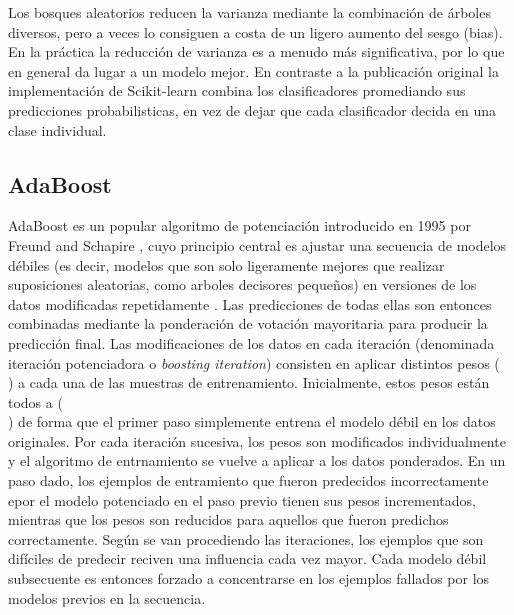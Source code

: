 Los bosques aleatorios reducen la varianza mediante la combinación de árboles diversos, pero a veces lo consiguen a costa de un ligero aumento del sesgo (bias).
En la práctica la reducción de varianza es a menudo más significativa, por lo que en general da lugar a un modelo mejor.
En contraste a la publicación original %
la implementación de Scikit-learn combina los clasificadores promediando sus predicciones probabilisticas, en vez de dejar que cada clasificador decida en una clase individual.

\subsection{AdaBoost}


AdaBoost es un popular algoritmo de potenciación introducido en 1995 por Freund and Schapire %
, cuyo principio central es ajustar una secuencia de modelos débiles (es decir, modelos que son solo ligeramente mejores que realizar suposiciones aleatorias, como arboles decisores pequeños) en versiones de los datos modificadas repetidamente . Las predicciones de todas ellas son entonces combinadas mediante la ponderación de votación mayoritaria para producir la predicción final.
Las modificaciones de los datos en cada iteración (denominada iteración potenciadora o  \emph{boosting iteration}) consisten en aplicar distintos pesos ($$$$) a cada una de las muestras de entrenamiento.
Inicialmente, estos pesos están todos a ($$$$) de forma que el primer paso simplemente entrena el modelo débil en los datos originales.
Por cada iteración sucesiva, los pesos son modificados individualmente y el algoritmo de entrnamiento se vuelve a aplicar a los datos ponderados. En un paso dado, los ejemplos de entramiento que fueron predecidos incorrectamente epor el modelo potenciado en el paso previo tienen sus pesos incrementados, mientras que los pesos son reducidos para aquellos que fueron predichos correctamente.
Según se van procediendo las iteraciones, los ejemplos que son difíciles de predecir reciven una influencia cada vez mayor.
Cada modelo débil subsecuente es entonces forzado a concentrarse en los ejemplos fallados por los modelos previos en la secuencia. %